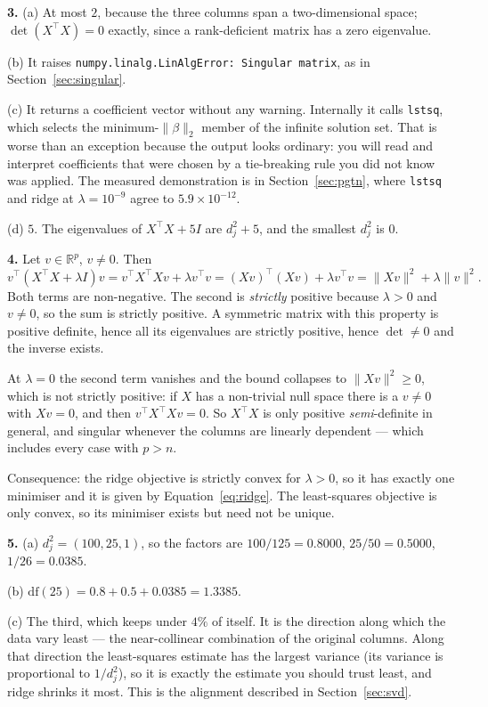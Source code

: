 \documentclass[11pt]{article}
\newcommand{\XtX}{X^{\!\top}\!X}
\begin{document}
\medskip
\textbf{3.} (a) At most $2$, because the three columns span a
two-dimensional space; $\det(\XtX) = 0$ exactly, since a rank-deficient
matrix has a zero eigenvalue.

(b) It raises \texttt{numpy.linalg.LinAlgError: Singular matrix}, as in
Section~\ref{sec:singular}.

(c) It returns a coefficient vector without any warning. Internally it calls
\texttt{lstsq}, which selects the minimum-$\|\beta\|_2$ member of the infinite
solution set. That is worse than an exception because the output looks
ordinary: you will read and interpret coefficients that were chosen by a
tie-breaking rule you did not know was applied. The measured demonstration is
in Section~\ref{sec:pgtn}, where \texttt{lstsq} and ridge at
$\lambda = 10^{-9}$ agree to $5.9\times10^{-12}$.

(d) $5$. The eigenvalues of $\XtX + 5I$ are $d_j^2 + 5$, and the smallest
$d_j^2$ is $0$.

\medskip
\textbf{4.} Let $v \in \mathbb{R}^p$, $v \ne 0$. Then
\[
  v^{\!\top}(\XtX + \lambda I)v = v^{\!\top}\XtX v + \lambda v^{\!\top}v
  = (Xv)^{\!\top}(Xv) + \lambda v^{\!\top}v = \|Xv\|^2 + \lambda\|v\|^2 .
\]
Both terms are non-negative. The second is \emph{strictly} positive because
$\lambda > 0$ and $v \ne 0$, so the sum is strictly positive. A symmetric
matrix with this property is positive definite, hence all its eigenvalues are
strictly positive, hence $\det \ne 0$ and the inverse exists.

At $\lambda = 0$ the second term vanishes and the bound collapses to
$\|Xv\|^2 \ge 0$, which is not strictly positive: if $X$ has a non-trivial
null space there is a $v \ne 0$ with $Xv = 0$, and then
$v^{\!\top}\XtX v = 0$. So $\XtX$ is only positive \emph{semi}-definite in
general, and singular whenever the columns are linearly dependent --- which
includes every case with $p > n$.

Consequence: the ridge objective is strictly convex for $\lambda > 0$, so it
has exactly one minimiser and it is given by Equation~\eqref{eq:ridge}. The
least-squares objective is only convex, so its minimiser exists but need not
be unique.

\medskip
\textbf{5.} (a) $d_j^2 = (100, 25, 1)$, so the factors are
$100/125 = 0.8000$, $25/50 = 0.5000$, $1/26 = 0.0385$.

(b) $\mathrm{df}(25) = 0.8 + 0.5 + 0.0385 = 1.3385$.

(c) The third, which keeps under $4\%$ of itself. It is the direction along
which the data vary least --- the near-collinear combination of the original
columns. Along that direction the least-squares estimate has the largest
variance (its variance is proportional to $1/d_j^2$), so it is exactly the
estimate you should trust least, and ridge shrinks it most. This is the
alignment described in Section~\ref{sec:svd}.
\end{document}
